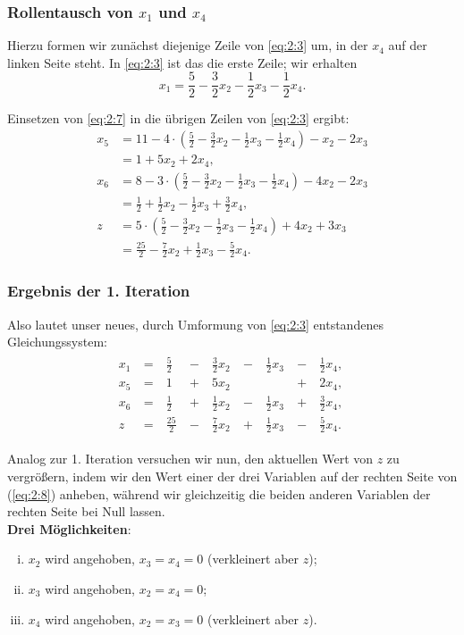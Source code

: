 \documentclass[smaller]{beamer}
\begin{document}
\begin{frame}
\frametitle{Rollentausch von $x_1$ und $x_4$}
 Hierzu formen wir zunächst diejenige Zeile von \eqref{eq:2:3} um, in der $x_4$ auf der linken Seite steht. In \eqref{eq:2:3} ist das die erste Zeile; wir erhalten
\begin{equation}
\label{eq:2:7}
x_1 = \frac{5}{2} - \frac{3}{2}x_2 - \frac{1}{2}x_3 - \frac{1}{2}x_4.
\end{equation}

Einsetzen von \eqref{eq:2:7} in die übrigen Zeilen von \eqref{eq:2:3} ergibt:
\begin{align*}
x_5 &= 11 - 4 \cdot \left( \frac{5}{2} - \frac{3}{2}x_2 - \frac{1}{2}x_3 - \frac{1}{2}x_4 \right) - x_2 - 2x_3 \\
    &= 1 + 5x_2 + 2x_4, \\
x_6 &= 8 - 3 \cdot \left( \frac{5}{2} - \frac{3}{2}x_2 - \frac{1}{2}x_3 - \frac{1}{2}x_4 \right) -4x_2 - 2x_3 \\
    &= \frac{1}{2} + \frac{1}{2}x_2 - \frac{1}{2}x_3 + \frac{3}{2}x_4, \\
z   &= 5 \cdot \left( \frac{5}{2} - \frac{3}{2}x_2 - \frac{1}{2}x_3 - \frac{1}{2}x_4 \right) + 4x_2 + 3x_3 \\
    &= \frac{25}{2} - \frac{7}{2}x_2 + \frac{1}{2}x_3 - \frac{5}{2}x_4.
\end{align*}
\end{frame}

\begin{frame}
 \frametitle{Ergebnis der 1. Iteration}
 Also lautet unser neues, durch Umformung von \eqref{eq:2:3} entstandenes Gleichungssystem:
\begin{align}
\begin{alignedat}{5}
\label{eq:2:8}
x_1 &\ = &\  \frac{5}{2} &\ - &\ \frac{3}{2}x_2 &\ - &\ \frac{1}{2}x_3 &\ - &\ \frac{1}{2}x_4,\ \\
x_5 &\ = &\            1 &\ + &\           5x_2 &    &                 &\ + &\           2x_4,\ \\
x_6 &\ = &\  \frac{1}{2} &\ + &\ \frac{1}{2}x_2 &\ - &\ \frac{1}{2}x_3 &\ + &\ \frac{3}{2}x_4,\ \\
z   &\ = &\ \frac{25}{2} &\ - &\ \frac{7}{2}x_2 &\ + &\ \frac{1}{2}x_3 &\ - &\ \frac{5}{2}x_4.\
\end{alignedat}
\end{align}

Analog zur 1. Iteration versuchen wir nun, den aktuellen Wert von $z$ zu vergrößern, indem wir den Wert einer der drei Variablen auf der rechten Seite von (\ref{eq:2:8}) anheben, während wir gleichzeitig die beiden anderen Variablen der rechten Seite bei Null lassen.\\
\vspace*{0.2cm}
\textbf{Drei M\"oglichkeiten}:
\begin{enumerate}[(i)]
\item $x_2$ wird angehoben, $x_3=x_4=0$ (verkleinert aber $z$);
\item $x_3$ wird angehoben, $x_2=x_4=0$;
\item $x_4$ wird angehoben, $x_2=x_3=0$ (verkleinert aber $z$).
\end{enumerate}
\end{frame}
\end{document}
